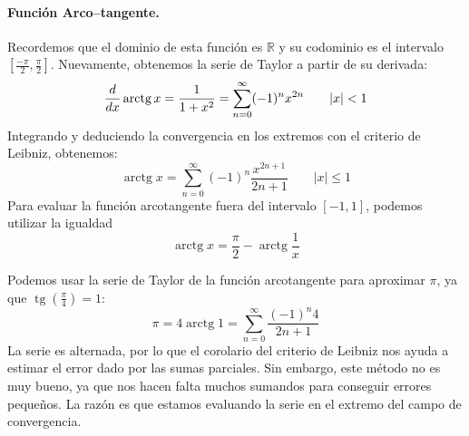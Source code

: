 \paragraph{Función Arco--tangente.}
Recordemos que el dominio de esta función es $\mathbb{R}$ y su codominio es el intervalo
$[\frac{-\pi}{2},\frac{\pi}{2}]$.
Nuevamente, obtenemos la serie de Taylor a partir de su derivada:
\[
\dfrac{d}{dx}\operatorname{arctg} x=\dfrac{1}{1+x^2}=\displaystyle\sum_{n=0}^\infty   (-1)^n x^{2n}\qquad |x|< 1
\]
Integrando y deduciendo la convergencia en los extremos con el criterio de Leibniz, obtenemos:
\[
\operatorname{arctg} x =\displaystyle\sum_{n=0}^\infty   (-1)^n\dfrac{x^{2n+1}}{2n+1}\qquad |x|\leq 1
\]
Para evaluar la función arcotangente fuera del intervalo $[-1,1]$, podemos utilizar la igualdad
\[
\operatorname{arctg} x =\dfrac{\pi}{2}-\operatorname{arctg}\dfrac{1}{x}
\]
%
\begin{ejemplo}
Podemos usar la serie de Taylor de la función arcotangente para aproximar $\pi$, ya que $\operatorname{tg}(\frac{\pi}4)=1$:
\[
\pi = 4\operatorname{arctg} 1 = \displaystyle\sum_{n=0}^\infty   \dfrac{(-1)^n4}{2n+1}
\]
La serie es alternada, por lo que el corolario del criterio de Leibniz nos ayuda a estimar el error dado por las sumas parciales.
Sin embargo, este método no es muy bueno, ya que nos hacen falta muchos sumandos para conseguir errores pequeños.
La razón es que estamos evaluando la serie en el extremo del campo de convergencia.\fej 
\end{ejemplo}
%

